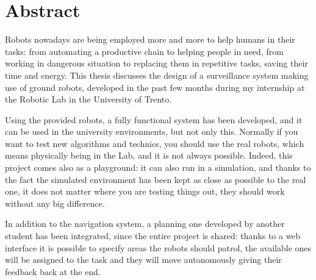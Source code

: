 
\chapter*{Abstract}
\label{abstract}

Robots nowadays are being employed more and more to help humans in their tasks:  from automating a productive chain to helping people in need, from working in dangerous situation to replacing them in repetitive tasks, saving their time and energy. This thesis discusses the design of a surveillance system making use of ground robots, developed in the past few months during my internship at the Robotic Lab in the University of Trento. 

Using the provided robots, a fully functional system has been developed, and it can be used in the university environments, but not only this. Normally if you want to test new algorithms and technics, you should use the real robots, which means physically being in the Lab, and it is not always possible. Indeed, this project comes also as a playground: it can also run in a simulation, and thanks to the fact the simulated environment has been kept as close as possible to the real one, it does not matter where you are testing things out, they should work without any big difference.

In addition to the navigation system, a planning one developed by another student has been integrated, since the entire project is shared: thanks to a web interface it is possible to specify areas the robots should patrol, the available ones will be assigned to the task and they will move autonomously giving their feedback back at the end.
